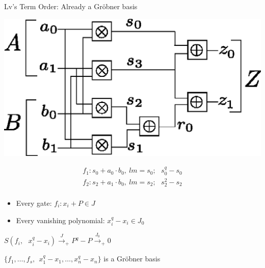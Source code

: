 \documentclass[xcolor=dvipsnames]{beamer}
\begin{document}
\begin{frame}{\large Lv's Term Order: Already a Gr\"obner basis}

\centerline{
\includegraphics[scale=0.4]{2bitmult.eps}
}
\vspace{-0.3in}
\begin{align*}
f_1: s_0+a_0 \cdot b_0, \ lm=s_0; ~~~s_0^q - s_0 \nonumber \\
f_2: s_2+a_1 \cdot b_0, \ lm=s_2; ~~~s_2^2 - s_2 \nonumber \\
\end{align*}
\vspace{-0.5in}

\begin{itemize}
\item Every gate: $f_i: x_i + P \in J$
\item Every vanishing polynomial: $x_i^q - x_i \in J_0$
\end{itemize}
$S(f_i, ~~~x_i^q - x_i) \stackrel{J}{\textstyle\longrightarrow}_+ P^q -
P \stackrel{J_0}{\textstyle\longrightarrow}_+ 0
$

$\{f_1, \dots, f_s, ~~x_1^q - x_1, \dots, x_n^q - x_n \}$  is a
Gr\"obner basis
\end{frame}



\end{document}
